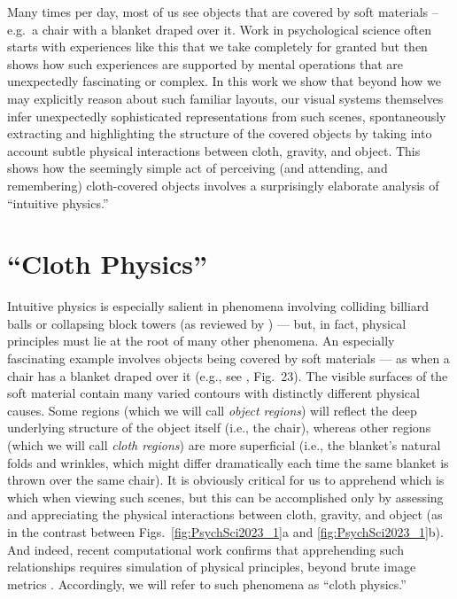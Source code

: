 \begin{kaobox}[frametitle=Statement of Relevance]
    Many times per day, most of us see objects that are covered by soft materials -- e.g.~a chair with a blanket draped over it. Work in psychological science often starts with experiences like this that we take completely for granted but then shows how such experiences are supported by mental operations that are unexpectedly fascinating or complex. In this work we show that beyond how we may explicitly reason about such familiar layouts, our visual systems themselves infer unexpectedly sophisticated representations from such scenes, spontaneously extracting and highlighting the structure of the covered objects by taking into account subtle physical interactions between cloth, gravity, and object. This shows how the seemingly simple act of perceiving (and attending, and remembering) cloth-covered objects involves a surprisingly elaborate analysis of ``intuitive physics.''
\end{kaobox}

\section{``Cloth Physics''}

Intuitive physics is especially salient in phenomena involving colliding billiard balls or collapsing block towers (as reviewed by \cite{kubricht_intuitive_2017}) --- but, in fact, physical principles must lie at the root of many other phenomena. An especially fascinating example involves objects being covered by soft materials --- as when a chair has a blanket draped over it (e.g., see \cite{tse_volume_1999}, Fig.~23). The visible surfaces of the soft material contain many varied contours with distinctly different physical causes. Some regions (which we will call \textit{object regions}) will reflect the deep underlying structure of the object itself (i.e., the chair), whereas other regions (which we will call \textit{cloth regions}) are more superficial (i.e., the blanket’s natural folds and wrinkles, which might differ dramatically each time the same blanket is thrown over the same chair). It is obviously critical for us to apprehend which is which when viewing such scenes, but this can be accomplished only by assessing and appreciating the physical interactions between cloth, gravity, and object (as in the contrast between Figs.~\ref{fig:PsychSci2023_1}a and \ref{fig:PsychSci2023_1}b). And indeed, recent computational work confirms that apprehending such relationships requires simulation of physical principles, beyond brute image metrics \parencite{bi_perception_2021}. Accordingly, we will refer to such phenomena as “cloth physics.”

